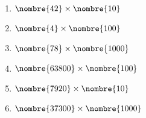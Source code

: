 

\begin{multicols}{3}
\begin{enumerate}[itemsep=1em]
	\item $\nombre{42} \times \nombre{10}$
	\item $\nombre{4} \times \nombre{100}$
	\item $\nombre{78} \times \nombre{1000}$
	\item $\nombre{63800} \times \nombre{100}$
	\item $\nombre{7920} \times \nombre{10}$
	\item $\nombre{37300} \times \nombre{1000}$
\end{enumerate}

\end{multicols}